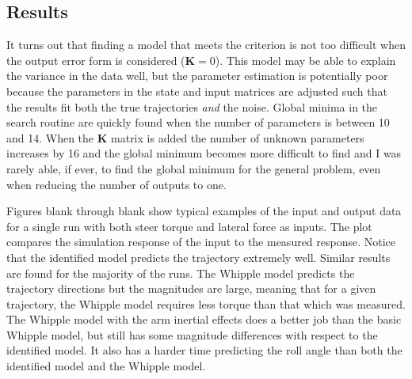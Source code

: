 \documentclass[a4paper]{article}
\begin{document}

\subsection{Results}


It turns out that finding a model that meets the criterion is not too difficult
when the output error form is considered ($\mathbf{K}=0$). This model may be
able to explain the variance in the data well, but the parameter estimation is
potentially poor because the parameters in the state and input matrices are
adjusted such that the results fit both the true trajectories \emph{and} the
noise. Global minima in the search routine are quickly found when the number of
parameters is between 10 and 14. When the $\mathbf{K}$ matrix is added the
number of unknown parameters increases by 16 and the global minimum becomes
more difficult to find and I was rarely able, if ever, to find the global
minimum for the general problem, even when reducing the number of outputs to
one.%

Figures blank through blank show typical examples of the input and output data
for a single run with both steer torque and lateral force as inputs. The plot
compares the simulation response of the input to the measured response. Notice
that the identified model predicts the trajectory extremely well. Similar
results are found for the majority of the runs. The Whipple model predicts the
trajectory directions but the magnitudes are large, meaning that for a given
trajectory, the Whipple model requires less torque than that which was
measured. The Whipple model with the arm inertial effects does a better job
than the basic Whipple model, but still has some magnitude differences with
respect to the identified model. It also has a harder time predicting the roll
angle than both the identified model and the Whipple model.

\end{document}
